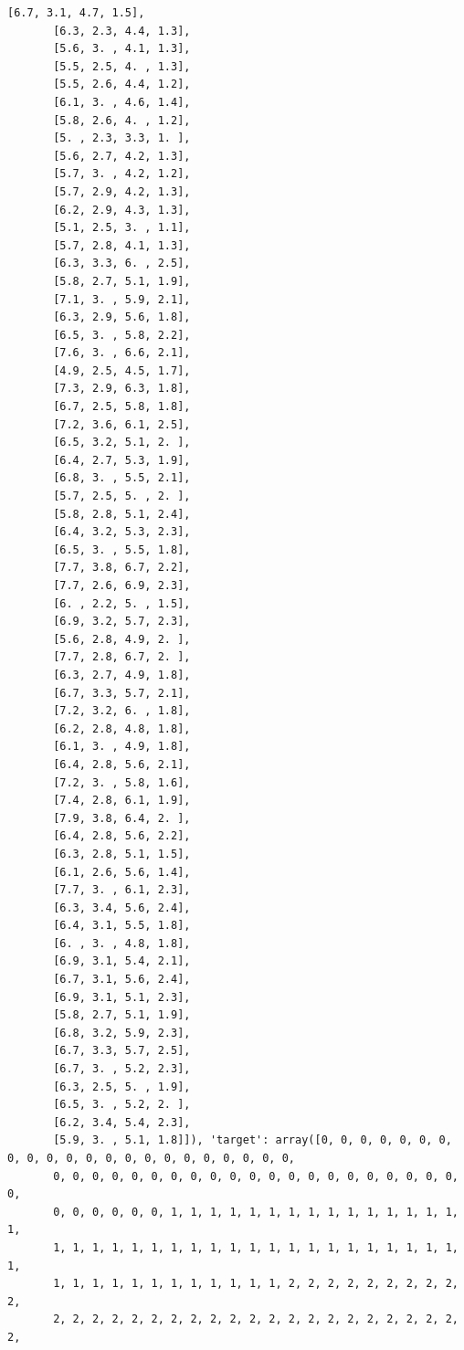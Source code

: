 \documentclass[11pt]{article}
\begin{document}
\begin{Verbatim}[commandchars=\\\{\}]
       [6.7, 3.1, 4.7, 1.5],
       [6.3, 2.3, 4.4, 1.3],
       [5.6, 3. , 4.1, 1.3],
       [5.5, 2.5, 4. , 1.3],
       [5.5, 2.6, 4.4, 1.2],
       [6.1, 3. , 4.6, 1.4],
       [5.8, 2.6, 4. , 1.2],
       [5. , 2.3, 3.3, 1. ],
       [5.6, 2.7, 4.2, 1.3],
       [5.7, 3. , 4.2, 1.2],
       [5.7, 2.9, 4.2, 1.3],
       [6.2, 2.9, 4.3, 1.3],
       [5.1, 2.5, 3. , 1.1],
       [5.7, 2.8, 4.1, 1.3],
       [6.3, 3.3, 6. , 2.5],
       [5.8, 2.7, 5.1, 1.9],
       [7.1, 3. , 5.9, 2.1],
       [6.3, 2.9, 5.6, 1.8],
       [6.5, 3. , 5.8, 2.2],
       [7.6, 3. , 6.6, 2.1],
       [4.9, 2.5, 4.5, 1.7],
       [7.3, 2.9, 6.3, 1.8],
       [6.7, 2.5, 5.8, 1.8],
       [7.2, 3.6, 6.1, 2.5],
       [6.5, 3.2, 5.1, 2. ],
       [6.4, 2.7, 5.3, 1.9],
       [6.8, 3. , 5.5, 2.1],
       [5.7, 2.5, 5. , 2. ],
       [5.8, 2.8, 5.1, 2.4],
       [6.4, 3.2, 5.3, 2.3],
       [6.5, 3. , 5.5, 1.8],
       [7.7, 3.8, 6.7, 2.2],
       [7.7, 2.6, 6.9, 2.3],
       [6. , 2.2, 5. , 1.5],
       [6.9, 3.2, 5.7, 2.3],
       [5.6, 2.8, 4.9, 2. ],
       [7.7, 2.8, 6.7, 2. ],
       [6.3, 2.7, 4.9, 1.8],
       [6.7, 3.3, 5.7, 2.1],
       [7.2, 3.2, 6. , 1.8],
       [6.2, 2.8, 4.8, 1.8],
       [6.1, 3. , 4.9, 1.8],
       [6.4, 2.8, 5.6, 2.1],
       [7.2, 3. , 5.8, 1.6],
       [7.4, 2.8, 6.1, 1.9],
       [7.9, 3.8, 6.4, 2. ],
       [6.4, 2.8, 5.6, 2.2],
       [6.3, 2.8, 5.1, 1.5],
       [6.1, 2.6, 5.6, 1.4],
       [7.7, 3. , 6.1, 2.3],
       [6.3, 3.4, 5.6, 2.4],
       [6.4, 3.1, 5.5, 1.8],
       [6. , 3. , 4.8, 1.8],
       [6.9, 3.1, 5.4, 2.1],
       [6.7, 3.1, 5.6, 2.4],
       [6.9, 3.1, 5.1, 2.3],
       [5.8, 2.7, 5.1, 1.9],
       [6.8, 3.2, 5.9, 2.3],
       [6.7, 3.3, 5.7, 2.5],
       [6.7, 3. , 5.2, 2.3],
       [6.3, 2.5, 5. , 1.9],
       [6.5, 3. , 5.2, 2. ],
       [6.2, 3.4, 5.4, 2.3],
       [5.9, 3. , 5.1, 1.8]]), 'target': array([0, 0, 0, 0, 0, 0, 0, 0, 0, 0, 0, 0, 0, 0, 0, 0, 0, 0, 0, 0, 0, 0,
       0, 0, 0, 0, 0, 0, 0, 0, 0, 0, 0, 0, 0, 0, 0, 0, 0, 0, 0, 0, 0, 0,
       0, 0, 0, 0, 0, 0, 1, 1, 1, 1, 1, 1, 1, 1, 1, 1, 1, 1, 1, 1, 1, 1,
       1, 1, 1, 1, 1, 1, 1, 1, 1, 1, 1, 1, 1, 1, 1, 1, 1, 1, 1, 1, 1, 1,
       1, 1, 1, 1, 1, 1, 1, 1, 1, 1, 1, 1, 2, 2, 2, 2, 2, 2, 2, 2, 2, 2,
       2, 2, 2, 2, 2, 2, 2, 2, 2, 2, 2, 2, 2, 2, 2, 2, 2, 2, 2, 2, 2, 2,

\end{Verbatim}
\end{document}
